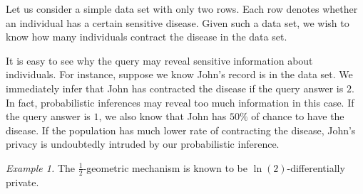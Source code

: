 
Let us consider a simple data set with only two rows. Each row denotes
whether an individual has a certain sensitive disease. Given such a
data set, we wish to know how many individuals contract the disease in
the data set.

It is easy to see why the query may reveal sensitive information about
individuals. For instance, suppose we know John's record is in the
data set. We immediately infer that John has contracted the disease if
the query answer is $2$. In fact, probabilistic inferences may reveal
too much information in this case. If the query answer is $1$, we also
know that John has $50\%$ of chance to have the disease. If the
population has much lower rate of contracting the disease, John's
privacy is undoubtedly intruded by our probabilistic inference.

\noindent
\textit{Example 1.}
The $\frac{1}{2}$-geometric mechanism is known to be
$\ln(2)$-differentially private. 


